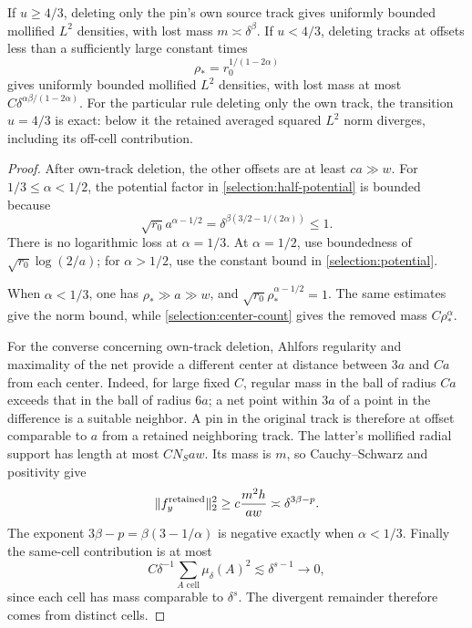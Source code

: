 \begin{proposition}
\label{selection:finite-theorem}
If \(u\ge4/3\), deleting only the pin's own source track gives
uniformly bounded mollified \(L^2\) densities, with lost mass
\(m\asymp\delta^\beta\). If \(u<4/3\), deleting tracks at offsets
less than a sufficiently large constant times
\[
 \rho_*=r_0^{1/(1-2\alpha)}
\]
gives uniformly bounded mollified \(L^2\) densities, with lost mass at most
\(C\delta^{\alpha\beta/(1-2\alpha)}\).
For the particular rule deleting only the own track, the transition
\(u=4/3\) is exact: below it the retained averaged squared \(L^2\)
norm diverges, including its off-cell contribution.
\end{proposition}
\begin{proof}
After own-track deletion, the other offsets are at least \(ca\gg w\).
For \(1/3\le\alpha<1/2\), the potential factor in
\eqref{selection:half-potential} is bounded because
\[
 \sqrt{r_0}a^{\alpha-1/2}
 =\delta^{\beta(3/2-1/(2\alpha))}\le1.
\]
There is no logarithmic loss at \(\alpha=1/3\). At \(\alpha=1/2\),
use boundedness of \(\sqrt{r_0}\log(2/a)\); for \(\alpha>1/2\),
use the constant bound in \eqref{selection:potential}.

When \(\alpha<1/3\), one has \(\rho_*\gg a\gg w\), and
\(\sqrt{r_0}\rho_*^{\alpha-1/2}=1\). The same estimates give the
norm bound, while \eqref{selection:center-count} gives the removed mass
\(C\rho_*^\alpha\).

For the converse concerning own-track deletion, Ahlfors regularity and
maximality of the net provide a different center at distance between
\(3a\) and \(Ca\) from each center. Indeed, for large fixed \(C\),
regular mass in the ball of radius \(Ca\) exceeds that in the ball
of radius \(6a\); a net point within \(3a\) of a point in the
difference is a suitable neighbor. A pin in the original track is therefore
at offset comparable to \(a\) from a retained neighboring track.
The latter's mollified radial support has length at most \(CN_Saw\).
Its mass is \(m\), so Cauchy--Schwarz and positivity give
\[
 \|f_y^{\rm retained}\|_2^2\ge c\frac{m^2h}{aw}
 \asymp\delta^{3\beta-p}.
\]
The exponent \(3\beta-p=\beta(3-1/\alpha)\) is negative exactly
when \(\alpha<1/3\). Finally the same-cell contribution is at most
\[
 C\delta^{-1}\sum_{A\text{ cell}}\mu_\delta(A)^2
 \lesssim\delta^{s-1}\longrightarrow0,
\]
since each cell has mass comparable to \(\delta^s\). The divergent
remainder therefore comes from distinct cells.
\end{proof}

